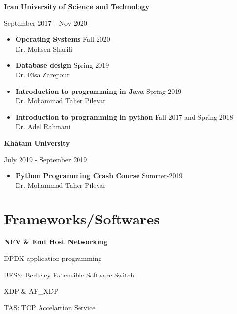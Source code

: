 \documentclass[11pt]{article}
\begin{document}
\noindent \textbf{Iran University of Science and Technology} \par
September 2017 – Nov 2020
{
    \renewcommand\labelitemi{}
    \begin{itemize}
        \item {\textbf{Operating Systems}  \null\hfill Fall-2020 \\ Dr. Mohsen Sharifi}
        \item {\textbf{Database design} \null\hfill Spring-2019 \\ Dr. Eisa Zarepour }
        \item {\textbf{Introduction to programming in Java} \null\hfill Spring-2019 \\
            Dr. Mohammad Taher Pilevar}
        \item {\textbf{Introduction to programming in python} \null\hfill Fall-2017 and Spring-2018 \\
            Dr. Adel Rahmani }
    \end{itemize}
}

{
\renewcommand\labelitemi{}
\noindent \textbf{Khatam University} \par
July 2019 - September 2019
\begin{itemize}
    \item {\textbf{Python Programming Crash Course}  \null\hfill Summer-2019 \\
        Dr. Mohammad Taher Pilevar}
\end{itemize}
}


\section{Frameworks/Softwares}

\noindent\textbf{NFV \& End Host Networking}
\begin{itemize}
    \begin{multicols}{2}
        \item DPDK application programming
        \item BESS: Berkeley Extensible Software Switch
        \item XDP \& AF\_XDP
        \item TAS: TCP Accelartion Service
    \end{multicols}
\end{itemize}

\end{document}
